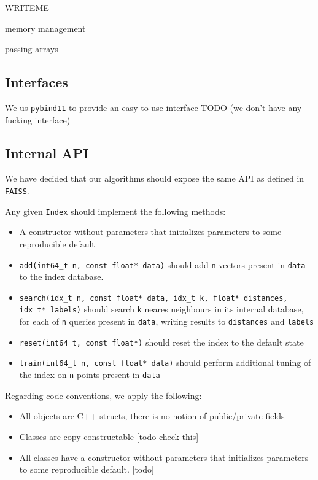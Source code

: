         WRITEME

        memory management
        
        passing arrays
    
    \subsection{Interfaces}
    
        We us \texttt{pybind11} to provide an easy-to-use interface
        TODO (we don't have any fucking interface)
        
    \subsection{Internal API}

        We have decided that our algorithms should expose the same API as defined in \texttt{FAISS}. 
        
        Any given \texttt{Index} should implement the following methods:
        \begin{itemize}
            
            \item A constructor without parameters that initializes parameters to some reproducible default
            
            \item \texttt{add(int64\_t n, const float* data)} 
                should add \texttt{n} vectors present in \texttt{data} to the index database.
            
            \item \texttt{search(idx\_t n, const float* data, idx\_t k, float* distances, idx\_t* labels)} 
                should search \texttt{k} neares neighbours 
                in its internal database, for each of \texttt{n} queries present in \texttt{data}, writing results to \texttt{distances} and \texttt{labels}
            
            \item \texttt{reset(int64\_t, const float*)} 
                should reset the index to the default state
            
            \item \texttt{train(int64\_t n, const float* data)} 
                should perform additional tuning of the index on \texttt{n} points present in \texttt{data}

        \end{itemize}
        
        Regarding code conventions, we apply the following:
        
        \begin{itemize}
            \item All objects are C++ structs, there is no notion of public/private fields
            \item Classes are copy-constructable [todo check this]
            \item All classes have a constructor without parameters that initializes parameters to some reproducible default. [todo]
        \end{itemize}
